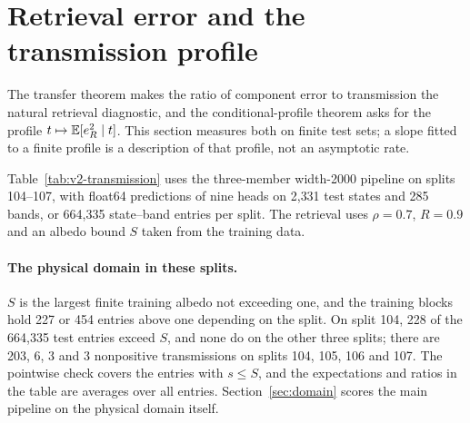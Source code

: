 \section{Retrieval error and the transmission profile}\label{sec:results-transfer}

The transfer theorem makes the ratio of component error to transmission the natural retrieval
diagnostic, and the conditional-profile theorem asks for the profile $t\mapsto\mathbb{E}[e_R^2\mid t]$.
This section measures both on finite test sets; a slope fitted to a finite profile is a
description of that profile, not an asymptotic rate.

Table~\ref{tab:v2-transmission} uses the three-member width-2000 pipeline on splits 104--107,
with float64 predictions of nine heads on 2{,}331 test states and 285 bands, or 664{,}335
state--band entries per split. The retrieval uses $\rho=0.7$, $R=0.9$ and an albedo bound $S$
taken from the training data.

\begin{table}[p]
\centering

\caption{Transmission diagnostics for the three-member width-2000 pipeline, splits 104--107.
Each cell with a spread is a mean $\pm$ sample standard deviation over the four splits. All
reflectance errors in this table are in reflectance units, not percentage points. Panel A gives
the retrieval-weighted error, the fitted profile slope and the raw and constrained percentiles;
panel B gives failure and clipping rates and the bound diagnostics. The violation count tests
the pointwise bound on the entries with $s\le S$; on entries with nonpositive transmission or an
albedo outside $[0,1)$ the bound expressions are diagnostics rather than bounds.}
\label{tab:v2-transmission}
\end{table}

\paragraph{The physical domain in these splits.}
$S$ is the largest finite training albedo not exceeding one, and the training blocks hold 227 or
454 entries above one depending on the split. On split 104, 228 of the 664{,}335 test entries
exceed $S$, and none do on the other three splits; there are 203, 6, 3 and 3 nonpositive
transmissions on splits 104, 105, 106 and 107. The pointwise check covers the entries with
$s\le S$, and the expectations and ratios in the table are averages over all entries.
Section~\ref{sec:domain} scores the main pipeline on the physical domain itself.

